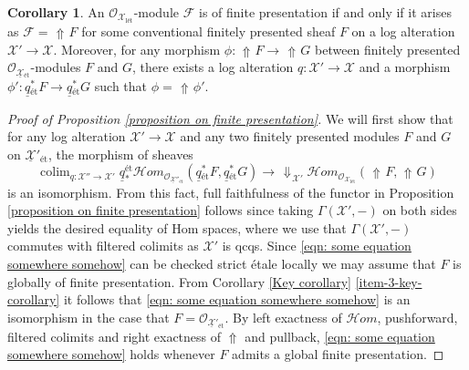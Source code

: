 \documentclass[11pt]{amsart}
\theoremstyle{definition}
\theoremstyle{definition}
\newtheorem{corollary}[theorem]{Corollary}
\DeclareMathOperator{\arrowup}{\!\Uparrow \!}
\DeclareMathOperator{\arrowdown}{\!\Downarrow\!}
\newcommand{\cF}{\mathcal{F}}
\newcommand{\ul}[1]{\underline{#1}}
\newcommand{\cal}{\mathcal}
\def\cF{{\cal F}}
\begin{document}
\begin{corollary}\label{corr: FP iff up FP}
    An $\mathcal{O}_{\mathcal{X}_{\text{l\'et}}}$-module $\mathcal{F}$ is of finite presentation if and only if it arises as $\cF= \arrowup F$ for some conventional finitely presented sheaf $F$ on a log alteration $\mathcal{X}'\rightarrow\mathcal{X}$. Moreover, for any morphism $\phi\colon \arrowup F\rightarrow \arrowup G$ between finitely presented $\mathcal{O}_{\ul{\mathcal{X}}{}_{\text{\'et}}}$-modules $F$ and $G$, there exists a log alteration $q\colon\mathcal{X}'\rightarrow \mathcal{X}$ and a morphism $\phi'\colon \ul{q}{}_{\text{\'et}}^*F\rightarrow \ul{q}{}_{\text{\'et}}^*G$ such that $\phi = \arrowup \phi'$.
\end{corollary}

\begin{proof}[Proof of Proposition \ref{proposition on finite presentation}]
We will first show that for any log alteration $\mathcal{X}'\rightarrow \mathcal{X}$ and any two finitely presented modules $F$ and $G$ on $\ul{\mathcal{X}}{}'_{\text{\'et}}$, the morphism of sheaves
\begin{equation}\label{eqn: some equation somewhere somehow}
    \mathop{\text{colim}}_{q\colon\mathcal{X}''\rightarrow \mathcal{X}'} \ul{q}{}^{\text{\'et}}_*\mathcal{H}om_{\mathcal{O}_{\ul{\mathcal{X}}{}''_{\text{\'et}}}}(\ul{q}{}_{\text{\'et}}^*F,\ul{q}{}_{\text{\'et}}^*G)\longrightarrow \arrowdown_{\mathcal{X}'}\mathcal{H}om_{\mathcal{O}_{\mathcal{X}_{\text{l\'et}}}}(\arrowup F,\arrowup G)
\end{equation}
is an isomorphism. From this fact, full faithfulness of the functor in Proposition \ref{proposition on finite presentation} follows since taking $\Gamma(\mathcal{X}',{-})$ on both sides yields the desired equality of Hom spaces, where we use that $\Gamma(\mathcal{X}',{-})$ commutes with filtered colimits as $\mathcal{X}'$ is qcqs. Since \eqref{eqn: some equation somewhere somehow} can be checked strict \'etale locally we may assume that $F$ is globally of finite presentation. From Corollary \ref{Key corollary} \eqref{item-3-key-corollary} it follows that \eqref{eqn: some equation somewhere somehow} is an isomorphism in the case that $F=\mathcal{O}_{\ul{\mathcal{X}}{}'_{\text{\'et}}}$. By left exactness of $\mathcal{H}om$, pushforward, filtered colimits and right exactness of $\Uparrow$ and pullback, \eqref{eqn: some equation somewhere somehow} holds whenever $F$ admits a global finite presentation.


\end{proof}
\end{document}
